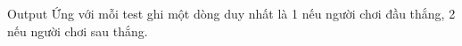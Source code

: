 Output
Ứng với mỗi test ghi một dòng duy nhất là 1 nếu người chơi đầu thắng, 2 nếu người chơi sau thắng.